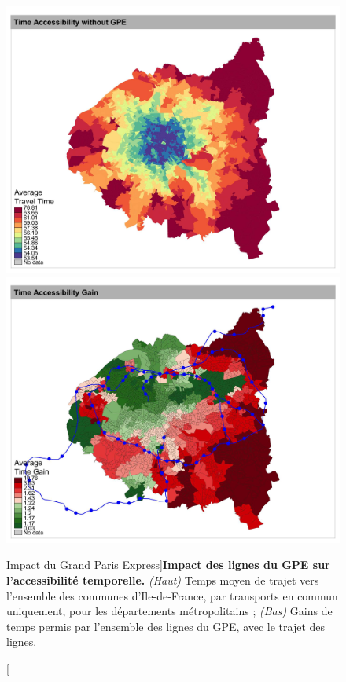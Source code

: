 \begin{figure}
	\includegraphics[width=0.8\linewidth]{Figures/CaseStudies/timeaccess_metropole}\\
	\includegraphics[width=0.8\linewidth]{Figures/CaseStudies/timegain_metropole}
	\caption[Impact of \emph{Grand Paris Express}][Impact du Grand Paris Express]{\label{fig:casestudies:gpe}}{\textbf{Impact des lignes du GPE sur l'accessibilité temporelle.} \textit{(Haut)} Temps moyen de trajet vers l'ensemble des communes d'Ile-de-France, par transports en commun uniquement, pour les départements métropolitains ; \textit{(Bas)} Gains de temps permis par l'ensemble des lignes du GPE, avec le trajet des lignes.\label{fig:casestudies:gpe}}
\end{figure}




